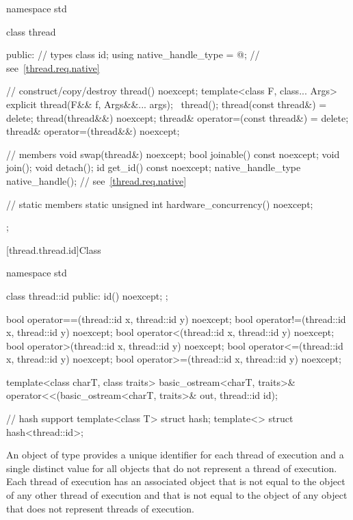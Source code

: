 %
\begin{codeblock}
namespace std {
  class thread {
  public:
    // types
    class id;
    using native_handle_type = @\impdefnc@;         // see~\ref{thread.req.native}

    // construct/copy/destroy
    thread() noexcept;
    template<class F, class... Args> explicit thread(F&& f, Args&&... args);
    ~thread();
    thread(const thread&) = delete;
    thread(thread&&) noexcept;
    thread& operator=(const thread&) = delete;
    thread& operator=(thread&&) noexcept;

    // members
    void swap(thread&) noexcept;
    bool joinable() const noexcept;
    void join();
    void detach();
    id get_id() const noexcept;
    native_handle_type native_handle();                         // see~\ref{thread.req.native}

    // static members
    static unsigned int hardware_concurrency() noexcept;
  };
}
\end{codeblock}

[thread.thread.id]{Class }

%
%
\begin{codeblock}
namespace std {
  class thread::id {
  public:
    id() noexcept;
  };

  bool operator==(thread::id x, thread::id y) noexcept;
  bool operator!=(thread::id x, thread::id y) noexcept;
  bool operator<(thread::id x, thread::id y) noexcept;
  bool operator>(thread::id x, thread::id y) noexcept;
  bool operator<=(thread::id x, thread::id y) noexcept;
  bool operator>=(thread::id x, thread::id y) noexcept;

  template<class charT, class traits>
    basic_ostream<charT, traits>&
      operator<<(basic_ostream<charT, traits>& out, thread::id id);

  // hash support
  template<class T> struct hash;
  template<> struct hash<thread::id>;
}
\end{codeblock}

\pnum An object of type  provides a unique identifier for
each thread of execution and a single distinct value for all 
objects that do not represent a thread of
execution. Each thread of execution has an
associated  object that is not equal to the
 object of any other thread of execution and that is not
equal to the  object of any  object that
does not represent threads of execution.

